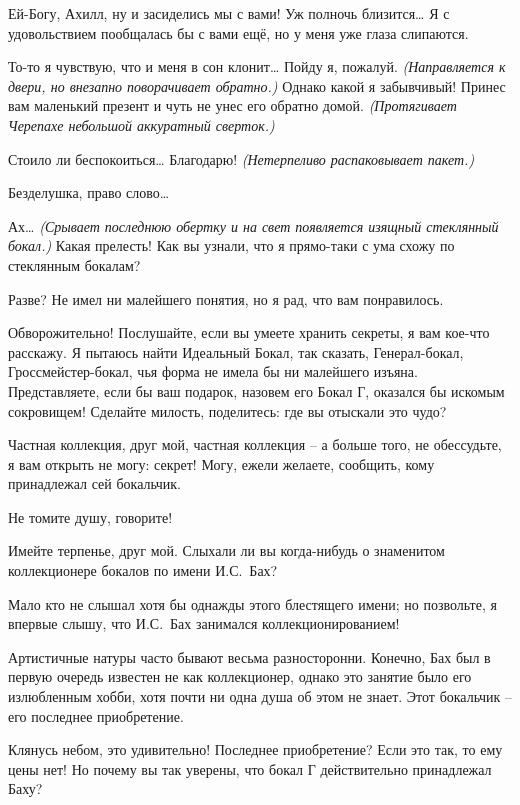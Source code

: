 \documentclass[../main.tex]{subfiles}
\begin{document}
\begin{Dialogue}
 Ей-Богу, Ахилл, ну и засиделись мы с вами! Уж полночь близится\ldots{} Я с удовольствием пообщалась бы с вами ещё, но у меня уже глаза слипаются.

 То-то я чувствую, что и меня в сон клонит\ldots{} Пойду я, пожалуй. \emph{(Направляется к двери, но внезапно поворачивает обратно.)} Однако какой я забывчивый! Принес вам маленький презент и чуть не унес его обратно домой. \emph{(Протягивает Черепахе небольшой аккуратный сверток.)}

 {\Large С}тоило ли беспокоиться\ldots{} Благодарю! \emph{(Нетерпеливо распаковывает пакет.)}

 {\Large Б}езделушка, право слово\ldots{}

 Ах\ldots{} \emph{(Срывает последнюю обертку и на свет появляется изящный стеклянный бокал.)} Какая прелесть! Как вы узнали, что я прямо-таки с ума схожу по стеклянным бокалам?

 Разве? Не имел ни малейшего понятия, но я рад, что вам понравилось.

 Обворожительно! Послушайте, если вы умеете хранить секреты, я вам кое-что расскажу. Я пытаюсь найти Идеальный Бокал, так сказать, Генерал-бокал, Гроссмейстер-бокал, чья форма не имела бы ни малейшего изъяна. Представляете, если бы ваш подарок, назовем его Бокал Г, оказался бы искомым сокровищем! Сделайте милость, поделитесь: где вы отыскали это чудо?

 Частная коллекция, друг мой, частная коллекция \--- а больше того, не обессудьте, я вам открыть не могу: секрет! Могу, ежели желаете, сообщить, кому принадлежал сей бокальчик.

 Не томите душу, говорите!

 Имейте терпенье, друг мой. Слыхали ли вы когда-нибудь о знаменитом коллекционере бокалов по имени И.С.~Бах?

 Мало кто не слышал хотя бы однажды этого блестящего имени; но позвольте, я впервые слышу, что И.С.~Бах занимался коллекционированием!

 {\Large А}ртистичные натуры часто бывают весьма разносторонни. Конечно, Бах был в первую очередь известен не как коллекционер, однако это занятие было его излюбленным хобби, хотя почти ни одна душа об этом не знает. Этот бокальчик \--- его последнее приобретение.

 Клянусь небом, это удивительно! Последнее приобретение? Если это так, то ему цены нет! Но почему вы так уверены, что бокал Г действительно принадлежал Баху?


\end{Dialogue}
\end{document}
